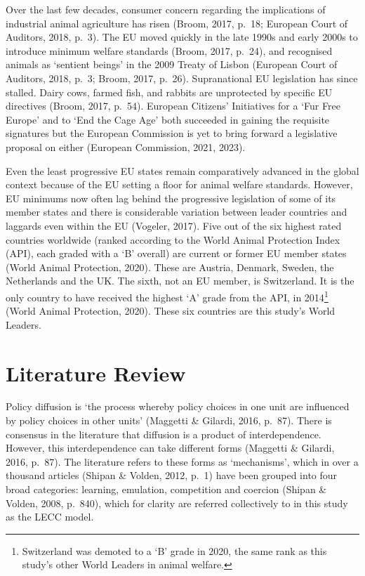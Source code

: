 \documentclass[twocolumn, 10pt, a4paper]{article}
\begin{document}
Over the last few decades, consumer concern regarding the implications of industrial
animal agriculture has risen (Broom, 2017, p.~18; European Court of Auditors, 2018,
p.~3). The EU moved quickly in the late 1990s and early 2000s to introduce minimum
welfare standards (Broom, 2017, p.~24), and recognised animals as `sentient beings'
in the 2009 Treaty of Lisbon (European Court of Auditors, 2018, p.~3; Broom, 2017,
p.~26). Supranational EU legislation has since stalled. Dairy cows, farmed fish, and
rabbits are unprotected by specific EU directives (Broom, 2017, p.~54). European
Citizens' Initiatives for a `Fur Free Europe' and to `End the Cage Age' both
succeeded in gaining the requisite signatures but the European Commission is yet to
bring forward a legislative proposal on either (European Commission, 2021, 2023).

Even the least progressive EU states remain comparatively advanced in the global
context because of the EU setting a floor for animal welfare standards. However, EU
minimums now often lag behind the progressive legislation of some of its member
states and there is considerable variation between leader countries and laggards even
within the EU (Vogeler, 2017). Five out of the six highest rated countries worldwide
(ranked according to the World Animal Protection Index (API), each graded with a `B'
overall) are current or former EU member states (World Animal Protection, 2020).
These are Austria, Denmark, Sweden, the Netherlands and the UK. The sixth, not an EU
member, is Switzerland. It is the only country to have received the highest `A' grade
from the API, in 2014\footnote{Switzerland was demoted to a `B' grade in 2020, the
same rank as this study's other World Leaders in animal welfare.} (World Animal
Protection, 2020). These six countries are this study's World Leaders.

\section{Literature Review}

Policy diffusion is `the process whereby policy choices in one unit are influenced
by policy choices in other units' (Maggetti \& Gilardi, 2016, p.~87). There is
consensus in the literature that diffusion is a product of interdependence. However,
this interdependence can take different forms (Maggetti \& Gilardi, 2016, p.~87).
The literature refers to these forms as `mechanisms', which in over a thousand
articles (Shipan \& Volden, 2012, p.~1) have been grouped into four broad
categories: learning, emulation, competition and coercion (Shipan \& Volden, 2008,
p.~840), which for clarity are referred collectively to in this study as the LECC
model.
\end{document}
